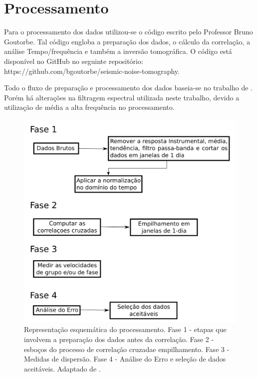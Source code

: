 \section{Processamento}

Para o processamento dos dados utilizou-se o código escrito pelo Professor Bruno Goutorbe. Tal código engloba a preparação dos dados, o cálculo da correlação, a análise Tempo/frequência e também a inversão tomográfica.  O código está disponível no GitHub no seguinte repositório: https://github.com/bgoutorbe/seismic-noise-tomography.

Todo o fluxo de preparação e processamento dos dados  baseia-se no trabalho de \cite{bensen_processing_2007}. Porém há alterações na filtragem espectral utilizada neste trabalho, devido a utilização de média a alta frequência no processamento.


\begin{figure}[!ht]
\centering
\includegraphics[scale=0.8]{Figs/fluxograma_bensen2007.png}
\caption[Representação esquemática do processamento.]{Representação esquemática do processamento. Fase 1 - etapas que involvem a preparação dos dados antes da correlação. Fase 2 - esboços do processo de correlação cruzadae empilhamento. Fase 3 -Medidas de dispersão. Fase 4 - Análise do Erro e seleção de dados aceitáveis. Adaptado de \cite{bensen_processing_2007}.}
\label{fluxograma_bensen2007}
\end{figure} 

